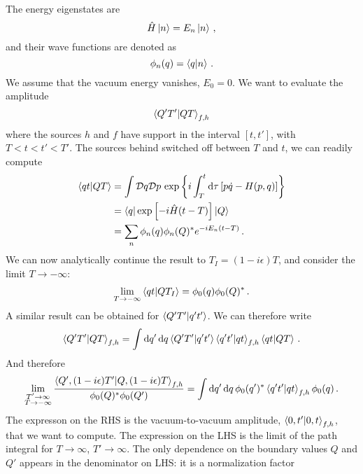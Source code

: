 \documentclass[notes]{subfiles}
\begin{document}
The energy eigenstates are
\begin{equation}
  \label{eq:EnEigen}
  \hat{H} \ket{n} = E_n \ket{n}\, ,
\end{equation}
and their wave functions are denoted as
\begin{equation}
  \label{eq:EnEigenFun}
  \phi_n(q) = \braket{q}{n}\, .
\end{equation}
We assume that the vacuum energy vanishes, $E_0=0$. We want to
evaluate the amplitude
\begin{equation}
  \label{eq:LargeQAmpl}
  \braket{Q'T'}{QT}_{f,h}
\end{equation}
where the sources $h$ and $f$ have support in the interval $[t,t']$,
with $T < t < t' < T'$. The sources behind switched off between $T$
and $t$, we can readily compute
\begin{align}
  \braket{qt}{QT} &= \int \mathcal{D}q \mathcal{D}p \,
                    \exp\left\{
                    i \int_T^t \dd{\tau} \left[
                    p \dot{q} - H(p,q)
                    \right]
                    \right\} \\
  &= \bra{q} \exp\left[-i \hat{H} (t-T)\right] \ket{Q} \\
  &= \sum_n \phi_n(q) \phi_n(Q)^* e^{-i E_n(t-T)}\, .
\end{align}
We can now analytically continue the result to $T_I=(1-i\epsilon)T$,
and consider the limit $T\to -\infty$:
\begin{align}
  \lim_{T\to -\infty} \braket{qt}{QT_I} = \phi_0(q) \phi_0(Q)^*\, .
\end{align}
A similar result can be obtained for $\braket{Q'T'}{q't'}$. We can
therefore write
\begin{align}
  \braket{Q'T'}{QT}_{f,h} = \int \dd{q'} \dd{q} \braket{Q'T'}{q't'} \braket{q't'}{qt}_{f,h}
  \braket{qt}{QT}\, .
\end{align}
And therefore
\begin{align}
 \lim_{\substack{T'\to\infty\\T\to -\infty}} 
\frac{\braket{Q', (1-i\epsilon)T'}{Q, (1-i\epsilon)T}_{f,h}}{\phi_0(Q)^* \phi_0(Q')} = 
  \int \dd{q'}\dd{q} \phi_0(q')^* \braket{q't'}{qt}_{f,h} \phi_0(q)\, .
\end{align}
The expresson on the RHS is the vacuum-to-vacuum amplitude,
$\braket{0,t'}{0,t}_{f,h}$, that we want to compute. The expression on
the LHS is the limit of the path integral for $T\to\infty$,
$T'\to\infty$. The only dependence on the boundary values $Q$ and $Q'$
appears in the denominator on LHS: it is a normalization factor
\end{document}
